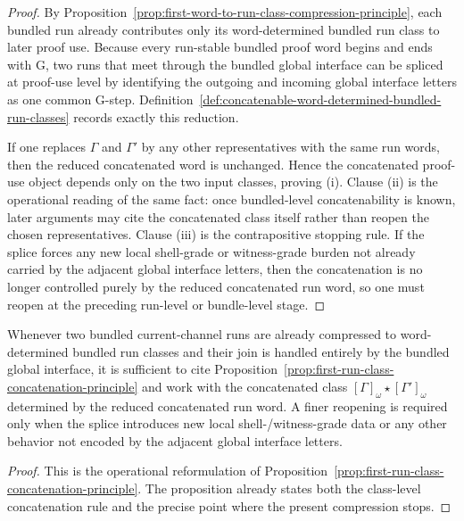\begin{proof}
By Proposition~\ref{prop:first-word-to-run-class-compression-principle}, each bundled run already contributes only its word-determined bundled run class to later proof use. Because every run-stable bundled proof word begins and ends with $\mathrm G$, two runs that meet through the bundled global interface can be spliced at proof-use level by identifying the outgoing and incoming global interface letters as one common $\mathrm G$-step. Definition~\ref{def:concatenable-word-determined-bundled-run-classes} records exactly this reduction.

If one replaces $\Gamma$ and $\Gamma'$ by any other representatives with the same run words, then the reduced concatenated word is unchanged. Hence the concatenated proof-use object depends only on the two input classes, proving (i). Clause (ii) is the operational reading of the same fact: once bundled-level concatenability is known, later arguments may cite the concatenated class itself rather than reopen the chosen representatives. Clause (iii) is the contrapositive stopping rule. If the splice forces any new local shell-grade or witness-grade burden not already carried by the adjacent global interface letters, then the concatenation is no longer controlled purely by the reduced concatenated run word, so one must reopen at the preceding run-level or bundle-level stage.
\end{proof}

\begin{corollary}
\label{cor:use-rule-for-the-first-run-class-concatenation-principle}
Whenever two bundled current-channel runs are already compressed to word-determined bundled run classes and their join is handled entirely by the bundled global interface, it is sufficient to cite Proposition~\ref{prop:first-run-class-concatenation-principle} and work with the concatenated class $[\Gamma]_{\omega}\star[\Gamma']_{\omega}$ determined by the reduced concatenated run word. A finer reopening is required only when the splice introduces new local shell-/witness-grade data or any other behavior not encoded by the adjacent global interface letters.
\end{corollary}

\begin{proof}
This is the operational reformulation of Proposition~\ref{prop:first-run-class-concatenation-principle}. The proposition already states both the class-level concatenation rule and the precise point where the present compression stops.
\end{proof}



